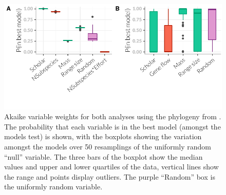  		





\begin{figure}[t]
\centering
  \includegraphics[width=1\textwidth]{figure/fstITPlots2-1.pdf}
  \caption[Akaike variable weights for analysis using alternative phylogeny]{
Akaike variable weights for both analyses using the phylogeny from \cite{jones2005bats}. 
The probability that each variable is in the best model (amongst the models test) is shown, with the boxplots showing the variation amongst the models over 50 resamplings of the uniformly random ``null'' variable. 
The three bars of the boxplot show the median values and upper and lower quartiles of the data, vertical lines show the range and points display outliers. 
The purple ``Random'' box is the uniformly random variable.
}
\label{f:A-itplots}
\end{figure}



















